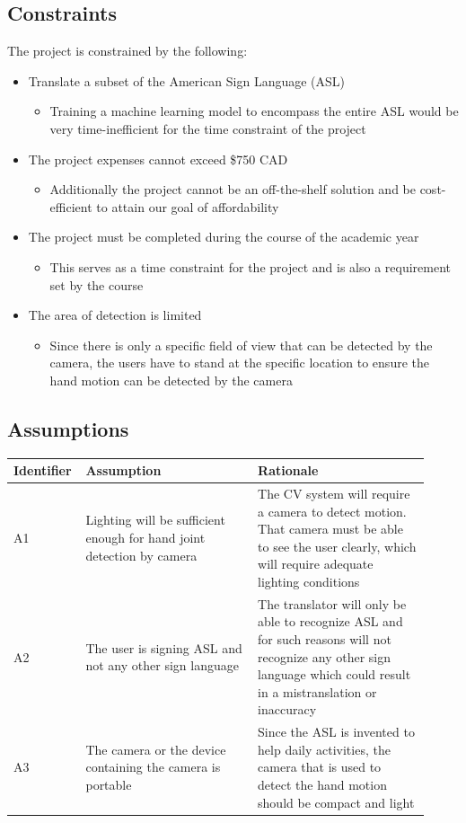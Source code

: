 \documentclass[12pt]{article}
\begin{document}
\subsection{Constraints}
The project is constrained by the following:
\begin{itemize}
  \item Translate a subset of the American Sign Language (ASL)
  \begin{itemize}
    \item Training a machine learning model to encompass the entire ASL would be very time-inefficient for the time constraint of the project
  \end{itemize}
    \item The project expenses cannot exceed \$750 CAD
  \begin{itemize}
    \item Additionally the project cannot be an off-the-shelf solution and be cost-efficient to attain our goal of affordability
  \end{itemize}
  \item The project must be completed during the course of the academic year
  \begin{itemize}
    \item This serves as a time constraint for the project and is also a requirement set by the course
  \end{itemize}
  \item The area of detection is limited
  \begin{itemize}
    \item Since there is only a specific field of view that can be detected by the camera, the users have to stand at the specific location 
    to ensure the hand motion can be detected by the camera
  \end{itemize}
\end{itemize}

\subsection{Assumptions}

\renewcommand{\arraystretch}{1.2}
\noindent \begin{tabularx}{\textwidth}{p{0.12\linewidth}|p{0.4\linewidth}|p{0.4\linewidth}}
\toprule
\textbf{Identifier} & \textbf{Assumption} & \textbf{Rationale}\\
\midrule
A1 
& Lighting will be sufficient enough for hand joint detection by camera 
& The CV system will require a camera to detect motion. That camera must be able to see the user clearly, 
which will require adequate lighting conditions\\
\hline
A2
& The user is signing ASL and not any other sign language
& The translator will only be able to recognize ASL and for such reasons will not recognize any other sign language 
which could result in a mistranslation or inaccuracy\\
\hline
A3
& The camera or the device containing the camera is portable
& Since the ASL is invented to help daily activities, the camera that is used to detect the hand motion should be compact and light\\
\bottomrule
\end{tabularx}
\end{document}
